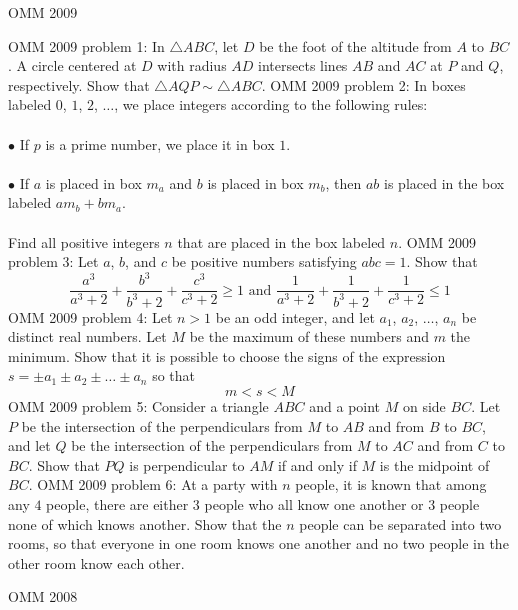 OMM 2009 

OMM 2009 problem 1:  In $\triangle ABC$, let $D$ be the foot of the altitude from $A$ to $BC$. A circle centered at $D$ with radius $AD$ intersects lines $AB$ and $AC$ at $P$ and $Q$, respectively. Show that $\triangle AQP\sim\triangle ABC$. 
OMM 2009 problem 2:  In boxes labeled $0$, $1$, $2$, $\dots$, we place integers according to the following rules: \\\\
$\bullet$ If $p$ is a prime number, we place it in box $1$. \\\\
$\bullet$ If $a$ is placed in box $m_a$ and $b$ is placed in box $m_b$, then $ab$ is placed in the box labeled $am_b+bm_a$. \\\\
Find all positive integers $n$ that are placed in the box labeled $n$. 
OMM 2009 problem 3:  Let $a$, $b$, and $c$ be positive numbers satisfying $abc=1$. Show that
\[
\frac{a^3}{a^3+2}+\frac{b^3}{b^3+2}+\frac{c^3}{c^3+2}\ge1\text{ and }\frac1{a^3+2}+\frac1{b^3+2}+\frac1{c^3+2}\le1
\] 
OMM 2009 problem 4:  Let $n>1$ be an odd integer, and let $a_1$, $a_2$, $\dots$, $a_n$ be distinct real numbers. Let $M$ be the maximum of these numbers and $m$ the minimum. Show that it is possible to choose the signs of the expression $s=\pm a_1\pm a_2\pm\dots\pm a_n$ so that
\[ m<s<M \] 
OMM 2009 problem 5:  Consider a triangle $ABC$ and a point $M$ on side $BC$. Let $P$ be the intersection of the perpendiculars from $M$ to $AB$ and from $B$ to $BC$, and let $Q$ be the intersection of the perpendiculars from $M$ to $AC$ and from $C$ to $BC$. Show that $PQ$ is perpendicular to $AM$ if and only if $M$ is the midpoint of $BC$. 
OMM 2009 problem 6:  At a party with $n$ people, it is known that among any $4$ people, there are either $3$ people who all know one another or $3$ people none of which knows another. Show that the $n$ people can be separated into two rooms, so that everyone in one room knows one another and no two people in the other room know each other. 

OMM 2008 

